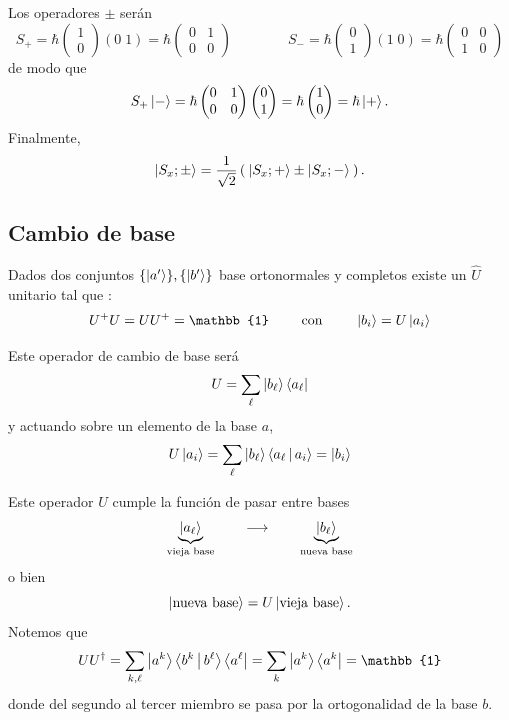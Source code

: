 \documentclass[10pt,oneside]{CBFT_book}
\begin{document}
Los operadores $\pm$ serán
\[
	S_+ = \hbar \begin{pmatrix} 1 \\ 0 \end{pmatrix} ( 0 \; 1 ) 
		= \hbar \begin{pmatrix}  0 & 1 \\ 0 & 0 \end{pmatrix}
	\qquad \qquad 
	S_- = \hbar \begin{pmatrix} 0 \\ 1 \end{pmatrix} ( 1 \; 0 ) 
		= \hbar \begin{pmatrix} 0 & 0 \\ 1 & 0 \end{pmatrix}
\]
de modo que
\[
	S_+ \Ket{-} = \hbar \begin{pmatrix}  0 & 1 \\ 0 & 0 \end{pmatrix}
	\begin{pmatrix} 0 \\ 1 \end{pmatrix} = 
	\hbar \begin{pmatrix} 1 \\ 0 \end{pmatrix} = \hbar \Ket{+}.
\]
Finalmente,
\[
	\Ket{S_x ; \pm} = \frac{1}{\sqrt{2}} \left( \: \Ket{S_x ; +} \pm \Ket{S_x ; -} \: \right).
\]

\subsection{Cambio de base}

Dados dos conjuntos $\{ \Ket{a'} \}, \{ \Ket{b'} \} $ base ortonormales y completos 
existe un $\widehat{U}$ unitario tal que :
\[
	U^+U=UU^+=\mathbb{1} \qquad \text{ con }\qquad \Ket{b_i}=U\Ket{a_i}
\]

Este operador de cambio de base será 
\[
	U = \sum_\ell \Ket{b_\ell}\Bra{a_\ell}
\]
y actuando sobre un elemento de la base $a$,
\[
	U\Ket{a_i} = \sum_\ell \Ket{b_\ell}\Braket{a_\ell|a_i} = \Ket{b_i}
\]

Este operador $U$ cumple la función de pasar entre bases
\[
	\underbrace{\Ket{a_\ell}}_{\text{vieja base}} 
	\qquad 	\longrightarrow \qquad 
	\underbrace{\Ket{b_\ell}}_{\text{nueva base}}
\]
o bien
\[
	\Ket{\text{nueva base}} = U \Ket{\text{vieja base}}.
\]
Notemos que
\[
	U U^\dagger = \sum_{k,\ell} \Ket{a^k} \Braket{b^k | b^\ell} \Bra{a^\ell} =
	\sum_{k} \Ket{a^k}\Bra{a^k} = \mathbb{1}
\]
donde del segundo al tercer miembro se pasa por la ortogonalidad de la base $b$.
\end{document}
